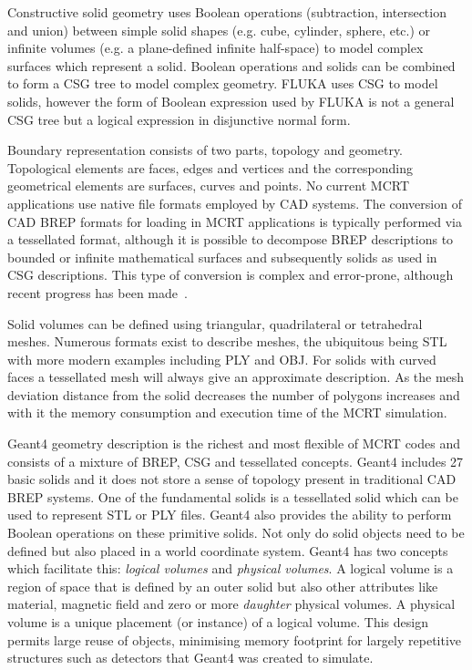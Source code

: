 \documentclass[preprint,12pt]{elsarticle}
\begin{document}
Constructive solid geometry uses Boolean operations (subtraction, intersection and union) between simple solid shapes (e.g. cube, cylinder, sphere, etc.) or infinite
volumes (e.g. a plane-defined infinite half-space) to model complex surfaces which represent a solid. Boolean operations and solids can be combined to form a
CSG tree to model complex geometry. FLUKA uses CSG to model solids, however the form of Boolean expression used by FLUKA is not a general CSG tree but a
logical expression in disjunctive normal form.

Boundary representation consists of two parts, topology and geometry. Topological elements are faces, edges and vertices and the corresponding
geometrical elements are surfaces, curves and points. No current MCRT applications use native file formats employed by CAD systems. The conversion of
CAD BREP formats for loading in MCRT applications is typically performed via a tessellated format, although it is possible to decompose BREP descriptions
 to bounded or infinite mathematical surfaces and subsequently solids as used in CSG descriptions. This type of conversion is complex and error-prone,
 although recent progress has been made~\cite{WangNuclSciTech31-82-2020}.

Solid volumes can be defined using triangular, quadrilateral or tetrahedral meshes. Numerous formats exist to describe meshes, the ubiquitous being STL with
more modern examples including PLY and OBJ. For solids with curved faces a tessellated mesh will always give an approximate description. As the mesh
deviation distance from the solid decreases the number of polygons increases and with it the memory consumption and execution time of the MCRT simulation.

Geant4 geometry description is the richest and most flexible of MCRT codes
and consists of a mixture of BREP, CSG and tessellated concepts. Geant4
includes 27 basic solids and it does not store a sense of topology
present in traditional CAD BREP systems. One of the fundamental solids is a
tessellated solid which can be used to represent STL or PLY files.  Geant4
also provides the ability to perform Boolean operations on these primitive
solids. Not only do solid objects need to be defined but also placed in a
world coordinate system. Geant4 has two concepts which facilitate this:
\emph{logical volumes} and \emph{physical volumes}. A logical volume is a
region of space that is defined by an outer solid but also other attributes
like material, magnetic field and zero or more \emph{daughter} physical
volumes. A physical volume is a unique placement (or instance) of a logical
volume. This design permits large reuse of objects, minimising memory
footprint for largely repetitive structures such as detectors that Geant4
was created to simulate.
\end{document}
